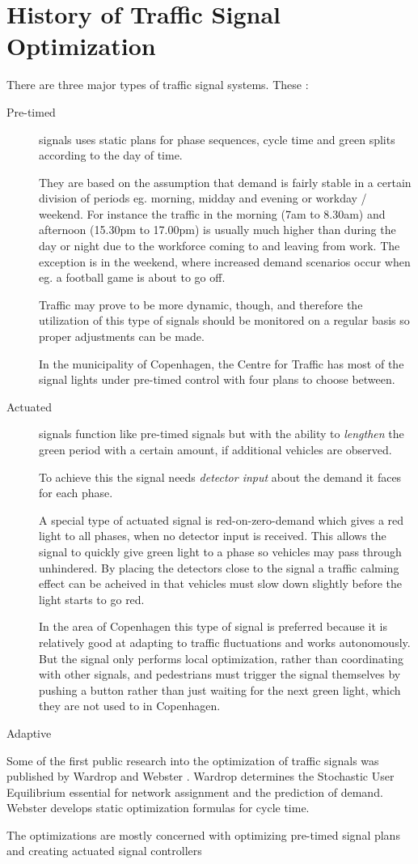 \section{History of Traffic Signal Optimization}
\label{history}

There are three major types of traffic signal systems. These :

\begin{description}
\item[Pre-timed] signals uses static plans for phase sequences, cycle time and green splits according to the day of time. 

They are based on the assumption that demand is fairly stable in a certain division of periods eg. morning, midday and evening or workday / weekend. For instance the traffic in the morning (7am to 8.30am) and afternoon (15.30pm to 17.00pm) is usually much higher than during the day or night due to the workforce coming to and leaving from work. The exception is in the weekend, where increased demand scenarios occur when eg. a football game is about to go off.

Traffic may prove to be more dynamic, though, and therefore the utilization of this type of signals should be monitored on a regular basis so proper adjustments can be made.

In the municipality of Copenhagen, the Centre for Traffic has most of the signal lights under pre-timed control with four plans to choose between.
\item[Actuated] signals function like pre-timed signals but with the ability to \textit{lengthen} the green period with a certain amount, if additional vehicles are observed. 

To achieve this the signal needs \textit{detector input} about the demand it faces for each phase.

A special type of actuated signal is red-on-zero-demand which gives a red light to all phases, when no detector input is received. This allows the signal to quickly give green light to a phase  so vehicles may pass through unhindered. By placing the detectors close to the signal a traffic calming effect can be acheived in that vehicles must slow down slightly before the light starts to go red.

In the area of Copenhagen this type of signal is preferred because it is relatively good at adapting to traffic fluctuations and works autonomously. But the signal only performs local optimization, rather than coordinating with other signals, and pedestrians must trigger the signal themselves by pushing a button rather than just waiting for the next green light, which they are not used to in Copenhagen.
\item[Adaptive]
\end{description}

Some of the first public research into the optimization of traffic signals was published by Wardrop \cite{Wardrop} and Webster \cite{Webster}. Wardrop determines the Stochastic User Equilibrium essential for network assignment and the prediction of demand. Webster develops static optimization formulas for cycle time.

The optimizations are mostly concerned with optimizing pre-timed signal plans and creating actuated signal controllers
